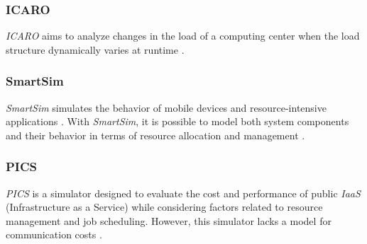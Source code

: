 {\subsubsection{ICARO}
\emph{ICARO} \cite{badii2016icaro} aims to analyze changes in the load of a computing center when the load structure dynamically varies at runtime \cite{khalil2017cloud}.

\subsubsection{SmartSim}
\emph{SmartSim} \cite{shiraz2012extendable} simulates the behavior of mobile devices and resource-intensive applications \cite{khalil2017cloud}. With \emph{SmartSim}, it is possible to model both system components and their behavior in terms of resource allocation and management \cite{suryateja2016comparative}.

\subsubsection{PICS}
\emph{PICS} \cite{kim2015pics} is a simulator designed to evaluate the cost and performance of public \emph{IaaS} (Infrastructure as a Service) while considering factors related to resource management and job scheduling. However, this simulator lacks a model for communication costs \cite{suryateja2016comparative}.


}
